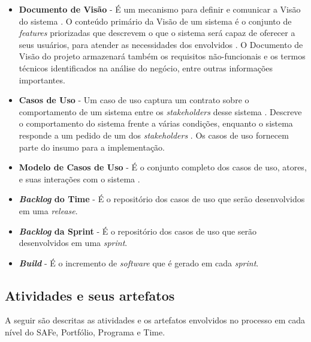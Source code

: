 \begin{itemize}
     \item \textbf{Documento de Visão} - É um mecanismo para definir e comunicar a Visão do sistema \cite{leffingwell11}.
      O conteúdo primário da Visão de um sistema é o conjunto de \textit{features} priorizadas que descrevem o que o sistema
      será capaz de oferecer a seus usuários, para atender as necessidades dos envolvidos \cite{leffingwell11}.
      O Documento de Visão do projeto armazenará também os requisitos não-funcionais e os termos técnicos identificados na
      análise do negócio, entre outras informações importantes.
 
     \item \textbf{Casos de Uso} - Um caso de uso captura um contrato sobre o comportamento de um sistema
      entre os \textit{stakeholders} desse sistema \cite{cockburn01}.
      Descreve o comportamento do sistema frente a várias condições, enquanto o sistema responde a
      um pedido de um dos \textit{stakeholders} \cite{cockburn01}. Os casos de uso fornecem parte do insumo para a implementação.
      
     \item \textbf{Modelo de Casos de Uso} - É o conjunto completo dos casos de uso, atores, e suas interações com o sistema \cite{leffingwell03}.
     
     \item \textbf{\textit{Backlog} do Time} - É o repositório dos casos de uso que serão desenvolvidos em uma \textit{release}.
     
     \item \textbf{\textit{Backlog} da Sprint} - É o repositório dos casos de uso que serão desenvolvidos em uma \textit{sprint}.
     
     \item \textbf{\textit{Build}} - É o incremento de \textit{software} que é gerado em cada \textit{sprint}.
     
    \end{itemize}

  \subsection{Atividades e seus artefatos}
    
    A seguir são descritas as atividades e os artefatos envolvidos no processo em cada nível do SAFe, Portfólio, Programa e Time.
    
    
    
    \pagebreak
    
    
    \pagebreak
    

    
    